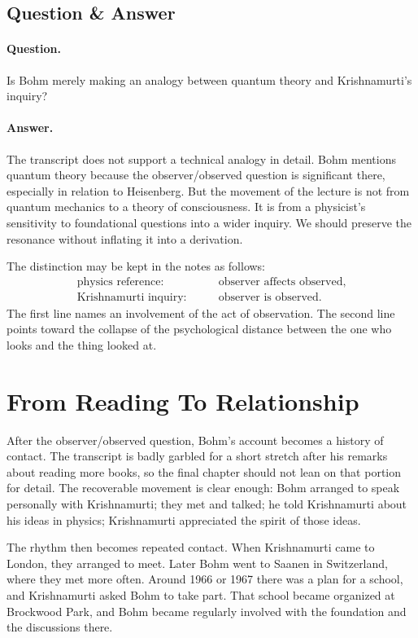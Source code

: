 \subsection{Question \& Answer}

\paragraph{Question.}
Is Bohm merely making an analogy between quantum theory and Krishnamurti's inquiry?

\paragraph{Answer.}
The transcript does not support a technical analogy in detail. Bohm mentions quantum theory because the observer/observed question is significant there, especially in relation to Heisenberg. But the movement of the lecture is not from quantum mechanics to a theory of consciousness. It is from a physicist's sensitivity to foundational questions into a wider inquiry. We should preserve the resonance without inflating it into a derivation.

The distinction may be kept in the notes as follows:
\begin{align}
\text{physics reference:}\qquad
&\text{observer affects observed},\\
\text{Krishnamurti inquiry:}\qquad
&\text{observer is observed}.
\end{align}
The first line names an involvement of the act of observation. The second line points toward the collapse of the psychological distance between the one who looks and the thing looked at.

\section{From Reading To Relationship}

After the observer/observed question, Bohm's account becomes a history of contact. The transcript is badly garbled for a short stretch after his remarks about reading more books, so the final chapter should not lean on that portion for detail. The recoverable movement is clear enough: Bohm arranged to speak personally with Krishnamurti; they met and talked; he told Krishnamurti about his ideas in physics; Krishnamurti appreciated the spirit of those ideas.

The rhythm then becomes repeated contact. When Krishnamurti came to London, they arranged to meet. Later Bohm went to Saanen in Switzerland, where they met more often. Around 1966 or 1967 there was a plan for a school, and Krishnamurti asked Bohm to take part. That school became organized at Brockwood Park, and Bohm became regularly involved with the foundation and the discussions there.

